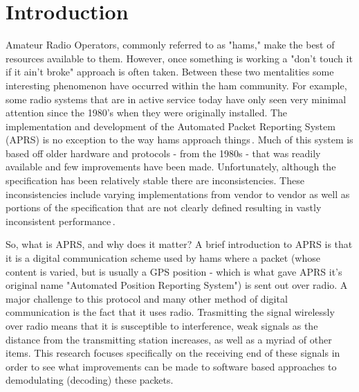 \chapter{Introduction}

Amateur Radio Operators, commonly referred to as "hams," make the best of resources available to them. However, once something is working a "don't touch it if it ain't broke" approach is often taken. Between these two mentalities some interesting phenomenon have occurred within the ham community. For example, some radio systems that are in active service today have only seen very minimal attention since the 1980's when they were originally installed. The implementation and development of the Automated Packet Reporting System (APRS) is no exception to the way hams approach things\,\cite{Bruninga}. Much of this system is based off older hardware and protocols - from the 1980s - that was readily available and few improvements have been made. Unfortunately, although the specification has been relatively stable there are inconsistencies. These inconsistencies include varying implementations from vendor to vendor as well as portions of the specification that are not clearly defined resulting in vastly inconsistent performance\,\cite{KWFThesis, KWFTAPR}.


So, what is APRS, and why does it matter? A brief introduction to APRS is that it is a digital communication scheme used by hams where a packet (whose content is varied, but is usually a GPS position - which is what gave APRS it's original name "Automated Position Reporting System"\cite{WikiAPRS}) is sent out over radio. A major challenge to this protocol and many other method of digital communication is the fact that it uses radio. Trasmitting the signal wirelessly over radio means that it is susceptible to interference, weak signals as the distance from the transmitting station increases, as well as a myriad of other items. This research focuses specifically on the receiving end of these signals in order to see what improvements can be made to software based approaches to demodulating (decoding) these packets.

